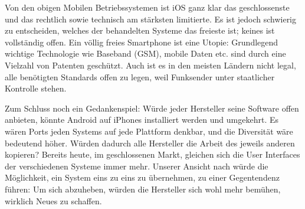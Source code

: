 Von den obigen Mobilen Betriebssystemen ist iOS ganz klar das geschlossenste und das rechtlich sowie technisch am stärksten  limitierte. Es ist jedoch schwierig zu entscheiden, welches der behandelten Systeme das freieste ist; keines ist vollständig offen. Ein völlig freies Smartphone ist eine Utopie: Grundlegend wichtige Technologie wie Baseband (GSM), mobile Daten etc. sind durch eine Vielzahl von Patenten geschützt. Auch ist es in den meisten Ländern nicht legal, alle benötigten Standards offen zu legen, weil Funksender unter staatlicher Kontrolle stehen.

Zum Schluss noch ein Gedankenspiel: Würde jeder Hersteller seine Software offen anbieten, könnte Android auf iPhones installiert werden und umgekehrt. Es wären Ports jeden Systems auf jede Plattform denkbar, und die Diversität wäre bedeutend höher. Würden dadurch alle Hersteller die Arbeit des jeweils anderen kopieren? Bereits heute, im geschlossenen Markt, gleichen sich die User Interfaces der verschiedenen Systeme immer mehr. Unserer Ansicht nach würde die Möglichkeit, ein System eins zu eins zu übernehmen, zu einer Gegentendenz führen: Um sich abzuheben, würden die Hersteller sich wohl mehr bemühen, wirklich Neues zu schaffen.